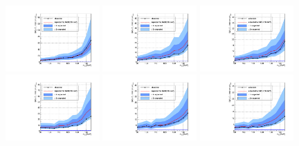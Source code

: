\begin{figure}
\begin{center}
  \includegraphics[width=0.32\textwidth]{4_Analisys/pics/limits/mmt/mmt_injected_7TeV.pdf}
  \includegraphics[width=0.32\textwidth]{4_Analisys/pics/limits/mmt/mmt_injected_8TeV.pdf}
  \includegraphics[width=0.32\textwidth]{4_Analisys/pics/limits/mmt/mmt_injected.pdf} \\
  \includegraphics[width=0.32\textwidth]{4_Analisys/pics/limits/emt/emt_injected_7TeV.pdf}
  \includegraphics[width=0.32\textwidth]{4_Analisys/pics/limits/emt/emt_injected_8TeV.pdf}
  \includegraphics[width=0.32\textwidth]{4_Analisys/pics/limits/emt/emt_injected.pdf} \\

\end{center}
\end{figure}
